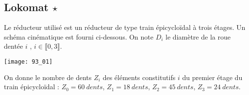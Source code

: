 \normaltrue \difficilefalse \tdifficilefalse
\correctionfalse


\subsection*{Lokomat $\star$ \label{CIN:03:C2:06:93}}
\setcounter{question}{0}


\ifcorrection
\else
{}
\fi

\ifprof
\else


Le réducteur utilisé est un réducteur de type train épicycloïdal à trois étages. Un schéma 
cinématique est fourni ci-dessous. 
On note $D_i$ le diamètre de la roue dentée $i$ , $i\in \llbracket 0,3 \rrbracket$. 

\begin{marginfigure}
\texttt{[image: 93\_01]}
\end{marginfigure}
On donne le nombre de dents $Z_i$ des éléments constitutifs $i$ du premier étage du train épicycloïdal : 
 $Z_0 = \SI{60}{dents}$,  $Z_1 = \SI{18}{dents}$,  $Z_2 = \SI{45}{dents}$,  $Z_3 = \SI{24}{dents}$.
\fi

\ifprof
\else
\fi

\ifprof ~\\

\else
\fi

\ifprof
\else
{}
\fi